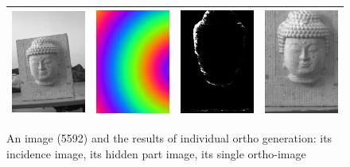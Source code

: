 \begin{figure}
\begin{tabular}{||c|c|c|c||}
   \hline \hline
   \includegraphics[width=40mm]{FIGS/Boudhas/IMG_5592.jpg} &
   \includegraphics[width=40mm]{FIGS/Boudhas/Incid_IMG_5592_8Bits.jpg} &
   \includegraphics[width=40mm]{FIGS/Boudhas/Hidden_5592.jpg}  &
   \includegraphics[width=40mm]{FIGS/Boudhas/Ort_IMG_5592.jpg} \\ \hline  \hline
\end{tabular}
\label{Resul:Ortho:MM}
\caption{An image (5592) and the results of individual ortho generation: 
its incidence image, its hidden part image, its single ortho-image}
\end{figure}












